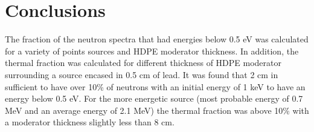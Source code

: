 \documentclass[draftcls,onecolumn]{IEEEtran}
\begin{document}



\section{Conclusions}
The fraction of the neutron spectra that had energies below 0.5 eV was calculated for a variety of points sources and HDPE moderator thickness.
In addition, the thermal fraction was calculated for different thickness of HDPE moderator surrounding a  source encased in 0.5 cm of lead.
It was found that 2 cm in sufficient to have over 10\% of neutrons with an initial energy of 1 keV to have an energy below 0.5 eV.
For the more energetic  source (most probable energy of 0.7 MeV and an average energy of 2.1 MeV) the thermal fraction was above 10\% with a moderator thickness slightly less than 8 cm.


\pagebreak
\pagebreak
\appendix

%
%
\end{document}
